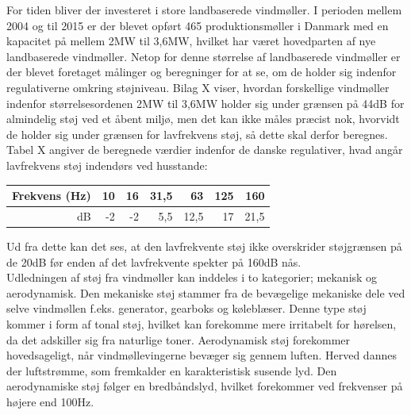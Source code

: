 For tiden bliver der investeret i store landbaserede vindmøller. I perioden mellem 2004 og til 2015 er der blevet opført 465 produktionsmøller i Danmark med en kapacitet på mellem 2MW til 3,6MW, hvilket har været hovedparten af nye landbaserede vindmøller. %
Netop for denne størrelse af landbaserede vindmøller er der blevet foretaget målinger og beregninger for at se, om de holder sig indenfor regulativerne omkring støjniveau. Bilag X %
viser, hvordan forskellige vindmøller indenfor størrelsesordenen 2MW til 3,6MW holder sig under grænsen på 44dB for almindelig støj ved et åbent miljø, men det kan ikke måles præcist nok, hvorvidt de holder sig under grænsen for lavfrekvens støj, så dette skal derfor beregnes. Tabel X angiver de beregnede værdier indenfor de danske regulativer, hvad angår lavfrekvens støj indendørs ved husstande: \\
\begin{table}[H]
\centering
\begin{tabular}{|r|r|r|r|r|r|r|} \hline
Frekvens (Hz) & 10 & 16 & 31,5 & 63 & 125 & 160 \\ \hline
dB & -2 & -2 & 5,5 & 12,5 & 17 & 21,5 \\ \hline
\end{tabular}
\end{table}

Ud fra dette kan det ses, at den lavfrekvente støj ikke overskrider støjgrænsen på de 20dB før enden af det lavfrekvente spekter på 160dB nås. %
\\
Udledningen af støj fra vindmøller kan inddeles i to kategorier; mekanisk og aerodynamisk. Den mekaniske støj stammer fra de bevægelige mekaniske dele ved selve vindmøllen f.eks. generator, gearboks og køleblæser. Denne type støj kommer i form af tonal støj, hvilket kan forekomme mere irritabelt for hørelsen, da det adskiller sig fra naturlige toner. Aerodynamisk støj forekommer hovedsageligt, når vindmøllevingerne bevæger sig gennem luften. Herved dannes der luftstrømme, som fremkalder en karakteristisk susende lyd. Den aerodynamiske støj følger en bredbåndslyd, hvilket forekommer ved frekvenser på højere end 100Hz. %